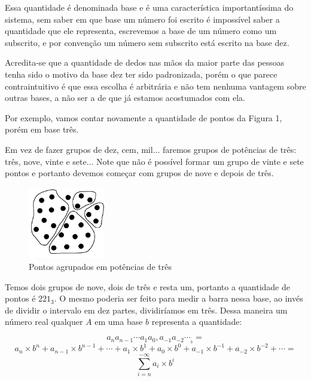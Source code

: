 \documentclass{report}
\theoremstyle{definition}
\begin{document}
Essa quantidade é denominada base e é uma característica importantíssima do sistema, sem saber em que base um número foi escrito é impossível saber a quantidade que ele representa, escrevemos a base de um número como um subscrito, e por convenção um número sem subscrito está escrito na base dez.

Acredita-se que a quantidade de dedos nas mãos da maior parte das pessoas tenha sido o motivo da base dez ter sido padronizada, porém o que parece contraintuitivo é que essa escolha é arbitrária e não tem nenhuma vantagem sobre outras bases, a não ser a de que já estamos acostumados com ela.

Por exemplo, vamos contar novamente a quantidade de pontos da Figura 1, porém em base três.

Em vez de fazer grupos de dez, cem, mil... faremos grupos de potências de três: três, nove, vinte e sete... Note que não é possível formar um grupo de vinte e sete pontos e portanto devemos começar com grupos de nove e depois de três.

\begin{figure}[H]
    \centering
    \includegraphics[width=0.3\textwidth]{imgs/pontosAgrupadosEm3.png}
    \caption{Pontos agrupados em potências de três}
\end{figure}

Temos dois grupos de nove, dois de três e resta um, portanto a quantidade de pontos é $221_3$. O mesmo poderia ser feito para medir a barra nessa base, ao invés de dividir o intervalo em dez partes, dividiríamos em três. Dessa maneira um número real qualquer $A$ em uma base $b$ representa a quantidade:

\begin{equation*}
a_n a_{n-1} \cdots a_1 a_0 , a_{-1} a_{-2} \cdots _{_b}=
\end{equation*}
\begin{equation*}
a_{n} \times b^{n} + a_{n-1} \times b^{n-1} + \cdots + a_{1} \times b^1 + a_{0} \times b^0 + a_{-1} \times b^{-1} + a_{-2} \times b^{-2} + \cdots=
\end{equation*}
\begin{equation}
\sum_{i=n}^{-\infty}a_i \times b^i
\end{equation}
\end{document}
